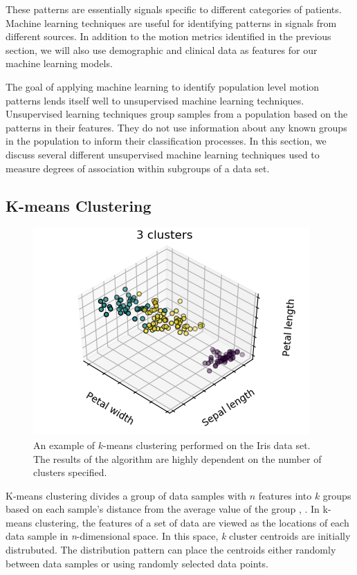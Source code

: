 These patterns are essentially signals specific to different categories of patients. Machine learning techniques are useful for identifying patterns in signals from different sources. In addition to the motion metrics identified in the previous section, we will also use demographic and clinical data as features for our machine learning models. 

The goal of applying machine learning to identify population level motion patterns lends itself well to unsupervised machine learning techniques. Unsupervised learning techniques group samples from a population based on the patterns in their features. They do not use information about any known groups in the population to inform their classification processes. In this section, we discuss several different unsupervised machine learning techniques used to measure degrees of association within subgroups of a data set.

\subsection{K-means Clustering}

\begin{figure}
\centering
\includegraphics[width=.5\textwidth]{4/kmeans-example.png}
\caption{An example of $k$-means clustering performed on the Iris data set. The results of the algorithm are highly dependent on the number of clusters specified.}
\label{ch4:fig:kmeans}
\end{figure}

K-means clustering divides a group of data samples with $n$ features into $k$ groups based on each sample's distance from the average value of the group \cite{Hartigan1979}, \cite{macqueen1967}. In k-means clustering, the features of a set of data are viewed as the locations of each data sample in \textit{n}-dimensional space. In this space, \textit{k} cluster centroids are initially distrubuted. The distribution pattern can place the centroids either randomly between data samples or using randomly selected data points.


